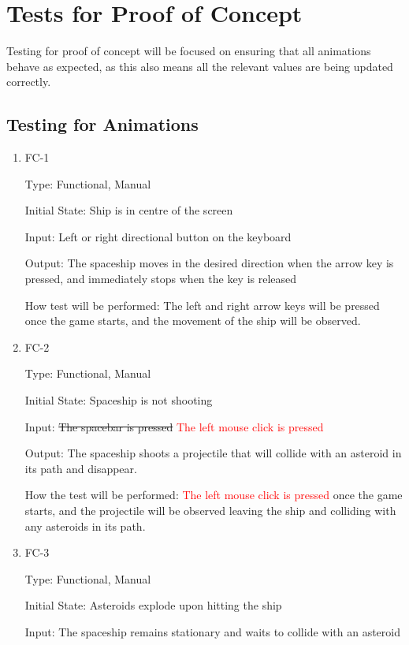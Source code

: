 \documentclass[12pt, titlepage]{article}
\begin{document}
\section{Tests for Proof of Concept}

Testing for proof of concept will be focused on ensuring that all animations behave as expected, as this also means all the relevant values are being updated correctly.

\subsection{Testing for Animations}

\begin{enumerate}

\item{FC-1}

Type: Functional, Manual
                    
Initial State: Ship is in centre of the screen
                    
Input: Left or right directional button on the keyboard
                    
Output: The spaceship moves in the desired direction when the arrow key is pressed, and immediately stops when the key is released
                    
How test will be performed: The left and right arrow keys will be pressed once the game starts, and the movement of the ship will be observed.
                    
\item{FC-2}

Type: Functional, Manual

Initial State: Spaceship is not shooting

Input: \sout{The spacebar is pressed} \textcolor{red}{The left mouse click is pressed}

Output: The spaceship shoots a projectile that will collide with an asteroid in its path and disappear. 

How the test will be performed: \textcolor{red}{The left mouse click is pressed} once the game starts, and the projectile will be observed leaving the ship and colliding with any asteroids in its path.

\item{FC-3}

Type: Functional, Manual

Initial State: Asteroids explode upon hitting the ship

Input: The spaceship remains stationary and waits to collide with an asteroid


\end{enumerate}
\end{document}
